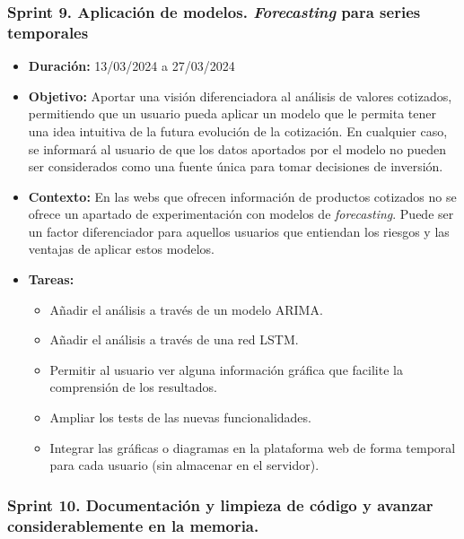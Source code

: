 \subsubsection{Sprint 9. Aplicación de modelos. \emph{Forecasting} para series temporales}

\begin{itemize}
\item  
\textbf{Duración:} 13/03/2024 a 27/03/2024

\item
\textbf{Objetivo:} Aportar una visión diferenciadora al análisis de valores cotizados, permitiendo que un usuario pueda aplicar un modelo que le permita tener una idea intuitiva de la futura evolución de la cotización. En cualquier caso, se informará al usuario de que los datos aportados por el modelo no pueden ser considerados como una fuente única para tomar decisiones de inversión. 


\item
\textbf{Contexto:} En las webs que ofrecen información de productos cotizados no se ofrece un apartado de experimentación con modelos de \emph{forecasting}. Puede ser un factor diferenciador para aquellos usuarios que entiendan los riesgos y las ventajas de aplicar estos modelos.  


\item
\textbf{Tareas:}
	\begin{itemize}
	\tightlist
	\item 
	Añadir el análisis a través de un modelo ARIMA. 
	\item
	Añadir el análisis a través de una red LSTM. 
	\item
	Permitir al usuario ver alguna información gráfica que facilite la comprensión de los resultados. 
	\item
	Ampliar los tests de las nuevas funcionalidades. 
	\item
	Integrar las gráficas o diagramas en la plataforma web de forma temporal para cada usuario (sin almacenar en el servidor).
  	\end{itemize}
\end{itemize}


\subsubsection{Sprint 10. Documentación y limpieza de código y avanzar considerablemente en la memoria.}

